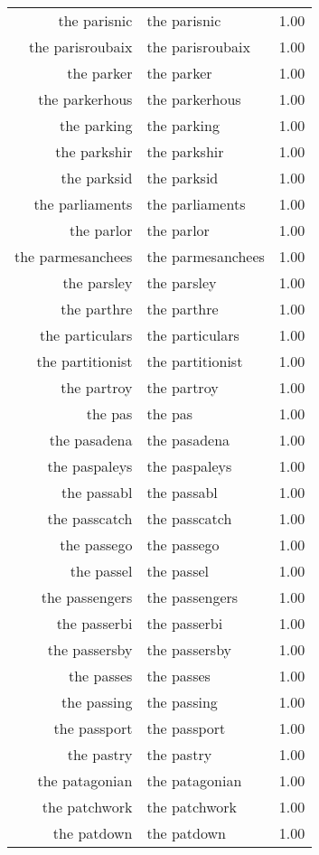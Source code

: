 \begin{table}[ht]
\begin{tabular}{rlr}
  the parisnic & the parisnic & 1.00 \\ 
  the parisroubaix & the parisroubaix & 1.00 \\ 
  the parker & the parker & 1.00 \\ 
  the parkerhous & the parkerhous & 1.00 \\ 
  the parking & the parking & 1.00 \\ 
  the parkshir & the parkshir & 1.00 \\ 
  the parksid & the parksid & 1.00 \\ 
  the parliaments & the parliaments & 1.00 \\ 
  the parlor & the parlor & 1.00 \\ 
  the parmesanchees & the parmesanchees & 1.00 \\ 
  the parsley & the parsley & 1.00 \\ 
  the parthre & the parthre & 1.00 \\ 
  the particulars & the particulars & 1.00 \\ 
  the partitionist & the partitionist & 1.00 \\ 
  the partroy & the partroy & 1.00 \\ 
  the pas & the pas & 1.00 \\ 
  the pasadena & the pasadena & 1.00 \\ 
  the paspaleys & the paspaleys & 1.00 \\ 
  the passabl & the passabl & 1.00 \\ 
  the passcatch & the passcatch & 1.00 \\ 
  the passego & the passego & 1.00 \\ 
  the passel & the passel & 1.00 \\ 
  the passengers & the passengers & 1.00 \\ 
  the passerbi & the passerbi & 1.00 \\ 
  the passersby & the passersby & 1.00 \\ 
  the passes & the passes & 1.00 \\ 
  the passing & the passing & 1.00 \\ 
  the passport & the passport & 1.00 \\ 
  the pastry & the pastry & 1.00 \\ 
  the patagonian & the patagonian & 1.00 \\ 
  the patchwork & the patchwork & 1.00 \\ 
  the patdown & the patdown & 1.00 \\ 

\end{tabular}
\end{table}
